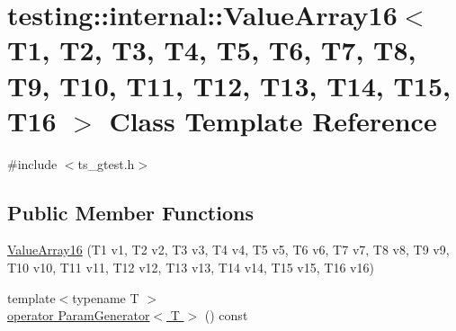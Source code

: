 \hypertarget{classtesting_1_1internal_1_1ValueArray16}{\section{testing\-:\-:internal\-:\-:Value\-Array16$<$ T1, T2, T3, T4, T5, T6, T7, T8, T9, T10, T11, T12, T13, T14, T15, T16 $>$ Class Template Reference}
\label{classtesting_1_1internal_1_1ValueArray16}
}


{\ttfamily \#include $<$ts\-\_\-gtest.\-h$>$}

\subsection*{Public Member Functions}
\begin{DoxyCompactItemize}
\item 
\hyperlink{classtesting_1_1internal_1_1ValueArray16_ac12b3a15ab5418665a97b4a225438529}{Value\-Array16} (T1 v1, T2 v2, T3 v3, T4 v4, T5 v5, T6 v6, T7 v7, T8 v8, T9 v9, T10 v10, T11 v11, T12 v12, T13 v13, T14 v14, T15 v15, T16 v16)
\item 
{\footnotesize template$<$typename T $>$ }\\\hyperlink{classtesting_1_1internal_1_1ValueArray16_a66c4563520a0edf203e0c1eaba521db4}{operator Param\-Generator$<$ T $>$} () const 
\end{DoxyCompactItemize}


